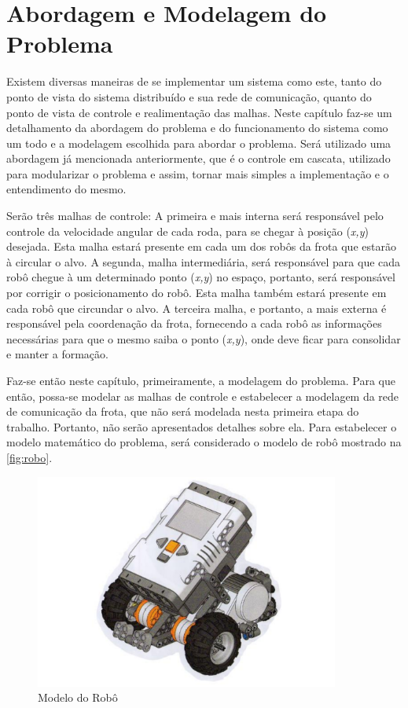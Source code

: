 %
%

\chapter{Abordagem e Modelagem do Problema}
\label{chap:abordagememdelo}
Existem diversas maneiras de se implementar um sistema como este, tanto do ponto de vista do sistema distribuído e sua rede de comunicação, quanto do ponto de vista de controle e realimentação das malhas. Neste capítulo faz-se um detalhamento da abordagem do problema e do funcionamento do sistema como um todo e a modelagem escolhida para abordar o problema. Será utilizado uma abordagem já mencionada anteriormente, que é o controle em cascata, utilizado para modularizar o problema e assim, tornar mais simples a implementação e o entendimento do mesmo. 

Serão três malhas de controle: A primeira e mais interna será responsável pelo controle da velocidade angular de cada roda, para se chegar à posição (\emph{x,y}) desejada. Esta malha estará presente em cada um dos robôs da frota que estarão à circular o alvo. A segunda, malha intermediária, será responsável para que cada robô chegue à um determinado ponto (\emph{x,y}) no espaço, portanto, será responsável por corrigir o posicionamento do robô. Esta malha também estará presente em cada robô que circundar o alvo. A terceira malha, e portanto, a mais externa é responsável pela coordenação da frota, fornecendo a cada robô as informações necessárias para que o mesmo saiba o ponto (\emph{x,y}), onde deve ficar para consolidar e manter a formação.

Faz-se então neste capítulo, primeiramente, a modelagem do problema. Para que então, possa-se modelar as malhas de controle e estabelecer a modelagem da rede de comunicação da frota, que não será modelada nesta primeira etapa do trabalho. Portanto, não serão apresentados detalhes sobre ela. Para estabelecer o modelo matemático do problema, será considerado o modelo de robô mostrado na \autoref{fig:robo}.

\begin{figure}[!htb]
	\centering
	\includegraphics[width=10cm]{./04-figuras/robo}
	\caption{Modelo do Robô}
	\label{fig:robo}
\end{figure}
 

